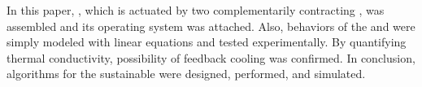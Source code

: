 In this paper, \antanospace, which is actuated by two complementarily contracting \scpsnospace, was assembled and its operating system was attached. Also, behaviors of the \scps and \anta were simply modeled with linear equations and tested experimentally. By quantifying thermal conductivity, possibility of feedback cooling was confirmed. In conclusion, algorithms for the sustainable \apc were designed, performed, and simulated.